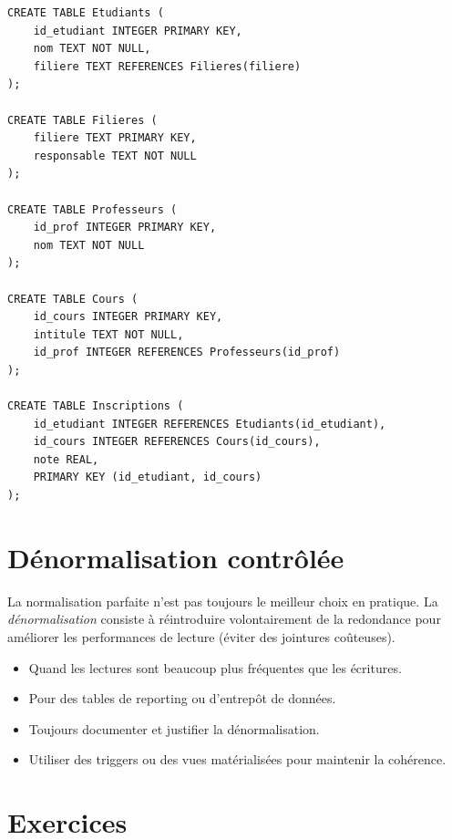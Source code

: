 \begin{codeblock}[title=\textbf{R\'esultat apr\`es normalisation en 3NF/BCNF}]
\begin{verbatim}
CREATE TABLE Etudiants (
    id_etudiant INTEGER PRIMARY KEY,
    nom TEXT NOT NULL,
    filiere TEXT REFERENCES Filieres(filiere)
);

CREATE TABLE Filieres (
    filiere TEXT PRIMARY KEY,
    responsable TEXT NOT NULL
);

CREATE TABLE Professeurs (
    id_prof INTEGER PRIMARY KEY,
    nom TEXT NOT NULL
);

CREATE TABLE Cours (
    id_cours INTEGER PRIMARY KEY,
    intitule TEXT NOT NULL,
    id_prof INTEGER REFERENCES Professeurs(id_prof)
);

CREATE TABLE Inscriptions (
    id_etudiant INTEGER REFERENCES Etudiants(id_etudiant),
    id_cours INTEGER REFERENCES Cours(id_cours),
    note REAL,
    PRIMARY KEY (id_etudiant, id_cours)
);
\end{verbatim}
\end{codeblock}

\section{D\'enormalisation contr\^ol\'ee}

\begin{remarque}
La normalisation parfaite n'est pas toujours le meilleur choix en pratique.
La \emph{d\'enormalisation} consiste \`a r\'eintroduire volontairement de la
redondance pour am\'eliorer les performances de lecture (\'eviter des jointures
co\^uteuses).
\end{remarque}

\begin{bonnepratique}[title=\textbf{Quand d\'enormaliser ?}]
\begin{itemize}
    \item Quand les lectures sont beaucoup plus fr\'equentes que les \'ecritures.
    \item Pour des tables de reporting ou d'entrep\^ot de donn\'ees.
    \item Toujours documenter et justifier la d\'enormalisation.
    \item Utiliser des triggers ou des vues mat\'erialis\'ees pour maintenir la coh\'erence.
\end{itemize}
\end{bonnepratique}

\section*{Exercices}

